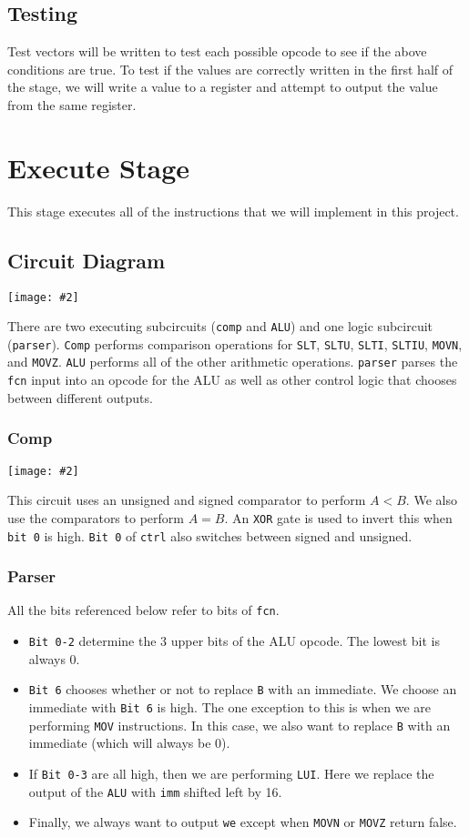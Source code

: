 \documentclass[10pt]{article}
\newcommand{\diagram}[2][1]{\begin{center}\texttt{[image: \#2]}\end{center}}
\begin{document}
\subsection{Testing}
Test vectors will be written to test each possible opcode to see if the above conditions are true.
To test if the values are correctly written in the first half of the stage, we will write a value to a register and attempt to output the value from the same register. 
\section{Execute Stage}
This stage executes all of the instructions that we will implement in this project. 
\subsection{Circuit Diagram}
\diagram{execute}
There are two executing subcircuits (\texttt{comp} and \texttt{ALU}) and one logic subcircuit (\texttt{parser}).
\texttt{Comp} performs comparison operations for \texttt{SLT}, \texttt{SLTU}, \texttt{SLTI}, \texttt{SLTIU}, \texttt{MOVN}, and \texttt{MOVZ}.
\texttt{ALU} performs all of the other arithmetic operations.
\texttt{parser} parses the \texttt{fcn} input into an opcode for the ALU as well as other control logic that chooses between different outputs.
\subsubsection{Comp}
\diagram[0.7]{comp}
This circuit uses an unsigned and signed comparator to perform $A < B$.
We also use the comparators to perform $A = B$. An \texttt{XOR} gate is used to invert this when \texttt{bit 0} is high.
\texttt{Bit 0} of \texttt{ctrl} also switches between signed and unsigned.
\subsubsection{Parser}
All the bits referenced below refer to bits of \texttt{fcn}.
\begin{itemize}
\item \texttt{Bit 0-2} determine the 3 upper bits of the ALU opcode. The lowest bit is always 0.
\item \texttt{Bit 6} chooses whether or not to replace \texttt{B} with an immediate. We choose an immediate with \texttt{Bit 6} is high.
  The one exception to this is when we are performing \texttt{MOV} instructions. In this case, we also want to replace \texttt{B} with an immediate (which will always be 0).
\item If \texttt{Bit 0-3} are all high, then we are performing \texttt{LUI}. Here we replace the output of the \texttt{ALU}
  with \texttt{imm} shifted left by 16.
\item Finally, we always want to output \texttt{we} except when \texttt{MOVN} or \texttt{MOVZ} return false.
\end{itemize}
\end{document}
